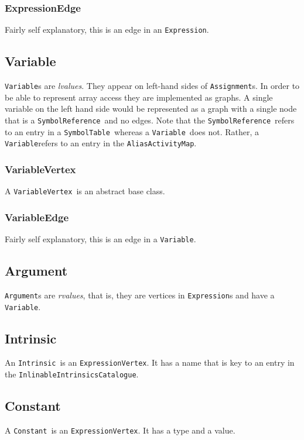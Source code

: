 \documentclass{book}
\newcommand{\AliasActivityMap}{{\tt AliasActivityMap}}
\newcommand{\Assignment}{{\tt Assignment}}
\newcommand{\Variable}{{\tt Variable}}
\newcommand{\VariableVertex}{{\tt VariableVertex}}
\newcommand{\Constant}{{\tt Constant}}
\newcommand{\Expression}{{\tt Expression}}
\newcommand{\ExpressionVertex}{{\tt ExpressionVertex}}
\newcommand{\InlinableIntrinsicsCatalogue}{{\tt InlinableIntrinsicsCatalogue}}
\newcommand{\Intrinsic}{{\tt Intrinsic}}
\newcommand{\SymbolReference}{{\tt SymbolReference}}
\newcommand{\SymbolTable}{{\tt SymbolTable}}
\newcommand{\Argument}{{\tt Argument}}
\begin{document}
\subsubsection{ExpressionEdge}
Fairly self explanatory, this is an edge in an \Expression.

\subsection{Variable}
\label{ssec:Variable}

{\Variable}s are {\em lvalues}. 
They appear on left-hand sides
of {\Assignment}s. 
In order to be able to represent array access they are implemented as graphs.
A single variable on the left hand side would be represented as a graph with a single 
node that is a \SymbolReference\ and no edges. 
Note that the \SymbolReference\ refers 
to an entry in a \SymbolTable\ whereas a \Variable\ does not. 
Rather, 
a \Variable refers to an entry in the \AliasActivityMap.

\subsubsection{VariableVertex}
A \VariableVertex\ is an abstract base class.

\subsubsection{VariableEdge}
Fairly self explanatory, this is an edge in a \Variable.

\subsection{Argument}
\label{ssec:Argument}

{\Argument}s are {\em rvalues}, that is, they are vertices in 
{\Expression}s and have a \Variable. 

\subsection{Intrinsic}
\label{ssec:Intrinsic}
An \Intrinsic\ is an \ExpressionVertex. It has a name 
that is key to  
an entry in the \InlinableIntrinsicsCatalogue.

\subsection{Constant}
\label{ssec:Constant}
A \Constant\ is an  \ExpressionVertex. It has a type 
and a value.
\end{document}
